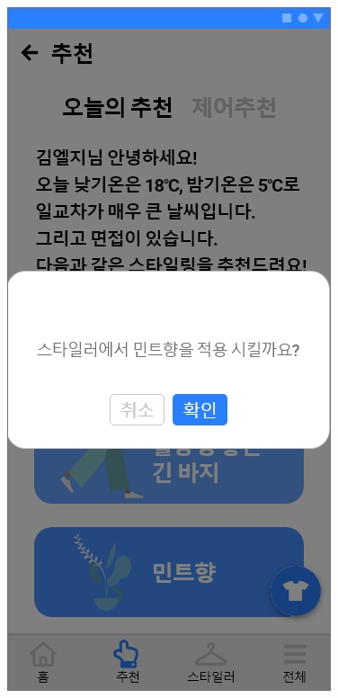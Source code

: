 \documentclass[conference]{IEEEtran}
\begin{document}
\begin{enumerate}
{                    \includegraphics[scale=0.24]{assets/추천5.jpg}}
    \begin{itemize}

\end{itemize}
\end{enumerate}
\end{document}

